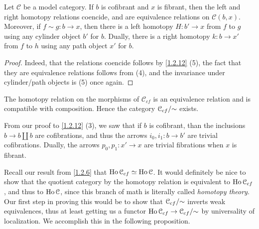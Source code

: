 \begin{corollary}\label{1.2.13}
	Let $\mathcal{C} $ be a model category. If $b$ is cofibrant and $x$ is fibrant, then the left and right homotopy relations coencide, and are equivalence relations on $\mathcal{C} (b,x)$. Moreover, if $f\sim g : b \to x$, then there is a left homotopy $H : b' \to x$ from $f$ to $g$ using any cylinder object $b'$ for $b$. Dually, there is a right homotopy $k : b \to x'$ from $f$ to $h$ using any path object $x'$ for $b$.
\end{corollary}
\begin{proof}
	Indeed, that the relations coencide follows by \cref{1.2.12} (5), the fact that they are equivalence relations follows from (4), and the invariance under cylinder/path objects is (5) once again.
\end{proof}
\begin{corollary}\label{1.2.14}
	The homotopy relation on the morphisms of $\mathcal{C} _{cf} $ is an equivalence relation and is compatible with composition. Hence the category $\mathcal{C} _{cf} /\mathbin{\sim} $ exists.
\end{corollary}

\begin{remark}\label{1.2.15}
	From our proof to \cref{1.2.12} (3), we saw that if $b$ is cofibrant, than the inclusions $b\to b\amalg b$ are cofibrations, and thus the arrows $i_0,i_1 : b \to b'$ are trivial cofibrations. Dually, the arrows $p_0,p_1 : x' \to x$ are trivial fibrations when $x$ is fibrant.
\end{remark}

Recall our result from \cref{1.2.6} that $\operatorname{Ho} \mathcal{C} _{cf} \simeq \operatorname{Ho} \mathcal{C} $. It would definitely be nice to show that the quotient category by the homotopy relation is equivalent to $\operatorname{Ho} \mathcal{C} _{cf} $, and thus to $\operatorname{Ho} \mathcal{C} $, since this branch of math is literally called \emph{homotopy theory}. Our first step in proving this would be to show that $\mathcal{C} _{cf} /\mathbin{\sim}$ inverts weak equivalences, thus at least getting us a functor $\operatorname{Ho} \mathcal{C} _{cf} \to \mathcal{C} _{cf} /\mathbin{\sim}$ by universality of localization. We accomplish this in the following proposition.

